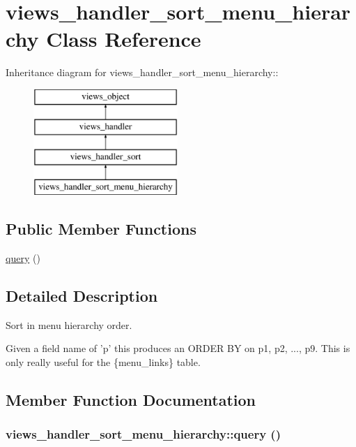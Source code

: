 \hypertarget{classviews__handler__sort__menu__hierarchy}{
\section{views\_\-handler\_\-sort\_\-menu\_\-hierarchy Class Reference}
\label{classviews__handler__sort__menu__hierarchy}
}
Inheritance diagram for views\_\-handler\_\-sort\_\-menu\_\-hierarchy::\begin{figure}[H]
\begin{center}
\leavevmode
\includegraphics[height=4cm]{classviews__handler__sort__menu__hierarchy}
\end{center}
\end{figure}
\subsection*{Public Member Functions}
\begin{CompactItemize}
\item 
\hyperlink{classviews__handler__sort__menu__hierarchy_04fd6337ac7ec486789586b65cf545fd}{query} ()
\end{CompactItemize}


\subsection{Detailed Description}
Sort in menu hierarchy order.

Given a field name of 'p' this produces an ORDER BY on p1, p2, ..., p9. This is only really useful for the \{menu\_\-links\} table. 

\subsection{Member Function Documentation}
\hypertarget{classviews__handler__sort__menu__hierarchy_04fd6337ac7ec486789586b65cf545fd}{
\subsubsection[{query}]{\setlength{\rightskip}{0pt plus 5cm}views\_\-handler\_\-sort\_\-menu\_\-hierarchy::query ()}}
\label{classviews__handler__sort__menu__hierarchy_04fd6337ac7ec486789586b65cf545fd}


